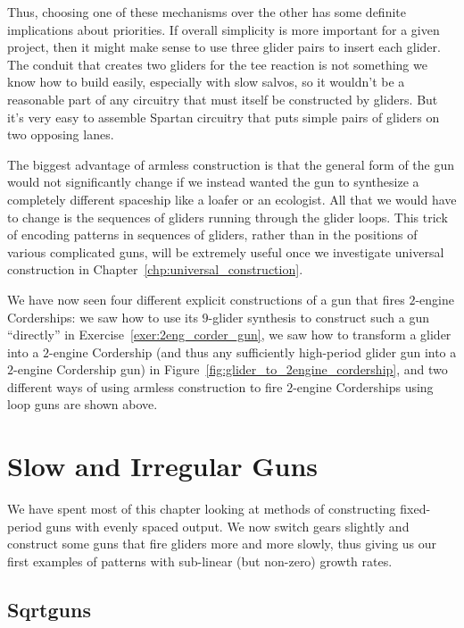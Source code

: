 Thus, choosing one of these mechanisms over the other has some definite implications about priorities. If overall simplicity is more important for a given project, then it might make sense to use three glider pairs to insert each glider. The conduit that creates two gliders for the tee reaction is not something we know how to build easily, especially with slow salvos, so it wouldn't be a reasonable part of any circuitry that must itself be constructed by gliders. But it's very easy to assemble Spartan circuitry that puts simple pairs of gliders on two opposing lanes. 

The biggest advantage of armless construction is that the general form of the gun would not significantly change if we instead wanted the gun to synthesize a completely different spaceship like a loafer or an ecologist.  All that we would have to change is the sequences of gliders running through the glider loops. This trick of encoding patterns in sequences of gliders, rather than in the positions of various complicated guns, will be extremely useful once we investigate universal construction in Chapter~\ref{chp:universal_construction}.

We have now seen four different explicit constructions of a gun that fires $2$-engine Corderships: we saw how to use its $9$-glider synthesis to construct such a gun ``directly'' in Exercise~\ref{exer:2eng_corder_gun}, we saw how to transform a glider into a $2$-engine Cordership (and thus any sufficiently high-period glider gun into a $2$-engine Cordership gun) in Figure~\ref{fig:glider_to_2engine_cordership}, and two different ways of using armless construction to fire $2$-engine Corderships using loop guns are shown above.


\section{Slow and Irregular Guns}\label{sec:irreg_guns}

We have spent most of this chapter looking at methods of constructing fixed-period guns with evenly spaced output. We now switch gears slightly and construct some guns that fire gliders more and more slowly, thus giving us our first examples of patterns with sub-linear (but non-zero) growth rates.


\subsection{Sqrtguns}\label{sec:sqrt_gun}

